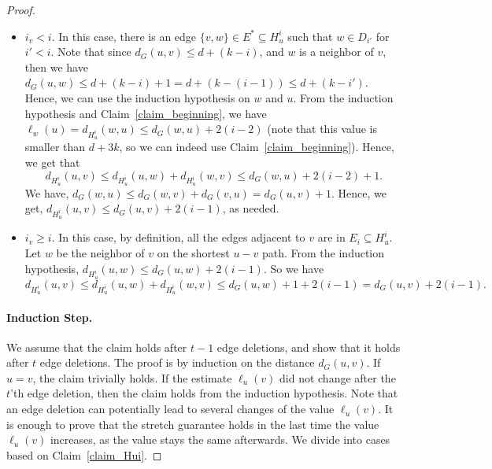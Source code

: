 \begin{proof}
\begin{itemize}
    \item [Case 1:] $i_v < i$. In this case, there is an edge $\{v,w\} \in E^* \subseteq H_u^i$ such that $w \in D_{i'}$ for $i' < i$. Note that since $d_G(u,v) \leq d+(k-i)$, and $w$ is a neighbor of $v$, then we have $d_G(u,w) \leq d +(k-i)+1 = d+(k-(i-1)) \leq d+(k-i')$. Hence, we can use the induction hypothesis on $w$ and $u$. From the induction hypothesis and Claim~\ref{claim_beginning}, we have 
    $\ell_w(u) = d_{H_u^i}(w,u) \leq d_G(w,u)+2(i-2)$ (note that this value is smaller than $d+3k$, so we can indeed use Claim~\ref{claim_beginning}). 
    Hence, we get that $$d_{H_u^i}(u,v) \leq d_{H_u^i}(u,w) + d_{H_u^i}(w,v) \leq d_G(w,u) + 2(i-2)+1.$$ We have, $d_G(w,u) \leq d_G(w,v)+d_G(v,u)=d_G(u,v)+1$.
    Hence, we get, $d_{H_u^i}(u,v) \leq d_G(u,v)+2(i-1)$, as needed.
    \item [Case 2:] $i_v \geq i$. In this case, by definition, all the edges adjacent to $v$ are in $E_i \subseteq H_u^i$. Let $w$ be the neighbor of $v$ on the shortest $u-v$ path. From the induction hypothesis, $d_{H_u^i}(u,w) \leq d_G(u,w)+2(i-1)$. So we have $$d_{H_u^i}(u,v) \leq d_{H_u^i}(u,w)+d_{H_u^i}(w,v) \leq d_G(u,w)+1+2(i-1)=d_G(u,v)+2(i-1).$$
\end{itemize}


\paragraph{Induction Step.} We assume that the claim holds after $t-1$ edge deletions, and show that it holds after $t$ edge deletions. The proof is by induction on the distance $d_G(u,v)$. If $u=v$, the claim trivially holds. If the estimate $\ell_u(v)$ did not change after the $t$'th edge deletion, then the claim holds from the induction hypothesis. Note that an edge deletion can potentially lead to several changes of the value $\ell_u(v)$. It is enough to prove that the stretch guarantee holds in the last time the value $\ell_u(v)$ increases, as the value stays the same afterwards. We divide into cases based on Claim~\ref{claim_Hui}.


\end{proof}
